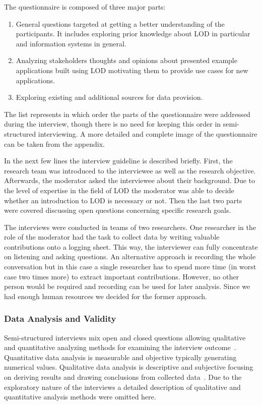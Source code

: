 \documentclass{article}
\begin{document}
The questionnaire is composed of three major parts:
\begin{enumerate}
	\item General questions targeted at getting a better understanding of the participants. It includes exploring prior knowledge about LOD in particular and information systems in general. 
	\item Analyzing stakeholders thoughts and opinions about presented example applications built using LOD motivating them to provide use cases for new applications. 
	\item Exploring existing and additional sources for data provision. 
\end{enumerate}


The list represents in which order the parts of the questionnaire were addressed during the interview, though there is no need for keeping this order in semi-structured interviewing.
A more detailed and complete image of the questionnaire can be taken from the appendix.

In the next few lines the interview guideline is described briefly.
First, the research team was introduced to the interviewee as well as the research objective. Afterwards, the moderator asked the interviewee about their background. Due to the level of expertise in the field of LOD the moderator was able to decide whether an introduction to LOD is necessary or not. Then the last two parts were covered discussing open questions concerning specific research goals.

The interviews were conducted in teams of two researchers. One researcher in the role of the moderator had the task to collect data by writing valuable contributions onto a logging sheet. This way, the interviewer can fully concentrate on listening and asking questions. An alternative approach is recording the whole conversation but in this case a single researcher has to spend more time (in worst case two times more) to extract important contributions. However, no other person would be required and recording can be used for later analysis.
Since we had enough human resources we decided for the former approach. 

\subsubsection{Data Analysis and Validity}
Semi-structured interviews mix open and closed questions allowing qualitative and quantitative analyzing methods for examining the interview outcome~\cite{article:runeson2009-interview-guidelines}. Quantitative data analysis is measurable and objective typically generating numerical values. Qualitative data analysis is descriptive and subjective focusing on deriving results and drawing conclusions from collected data~\cite{book:yin2013case}. Due to the exploratory nature of the interviews a detailed description of qualitative and quantitative analysis methods were omitted here.  
\end{document}
